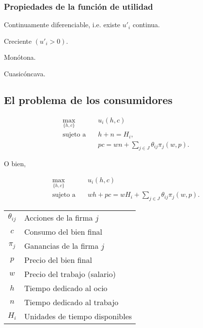 \documentclass[8pt,a4paper]{extarticle}
\begin{document}
\begin{multicols}{3}
\subsubsection*{Propiedades de la función de utilidad}

\begin{eqlist}
\item Continuamente diferenciable, i.e. existe $u'_i$ continua.
\item Creciente $(u'_i > 0)$.
\item Monótona.
\item Cuasicóncava.
\end{eqlist}

\subsection{El problema de los consumidores}

\begin{equation*}
\begin{aligned}
	\max_{\{h, c\}}\      & u_i(h, c) \\
	\text{sujeto a} \quad & h + n = H_i, \\
			              & pc = wn + \sum_{j \in J} \theta_{ij} \pi_j (w, p).
\end{aligned}
\end{equation*}

O bien,

\begin{equation*}
\begin{aligned}
	\max_{\{h, c\}}\	  & u_i(h, c) \\
	\text{sujeto a} \quad & wh + pc = wH_i + \sum_{j \in J} \theta_{ij} \pi_j (w, p).
\end{aligned}
\end{equation*}

\begin{center}
\begin{tabular}{ c l }
	\hline
	$\theta_{ij}$ & Acciones de la firma $j$ \\
	$c$           & Consumo del bien final \\
	$\pi_j$       & Ganancias de la firma $j$ \\
	$p$           & Precio del bien final \\
	$w$	          & Precio del trabajo (salario) \\
	$h$           & Tiempo dedicado al ocio \\
	$n$           & Tiempo dedicado al trabajo \\
	$H_i$         & Unidades de tiempo disponibles \\
	\hline
\end{tabular}
\end{center}


\end{multicols}
\end{document}
